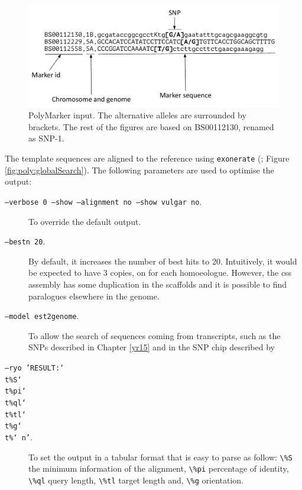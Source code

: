 \begin{figure}
    \includegraphics[width=1\textwidth]{PolyMarker/Figures/aln/input.pdf} 
      \caption[PolyMarker input]{PolyMarker input. The alternative alleles are surrounded by brackets. The rest of the figures are based on BS00112130, renamed as SNP-1.}
    \label{fig:poly:input}
\end{figure}

The template sequences are aligned to the reference using \verb|exonerate| (\citealt{Slater2005}; Figure \ref{fig:poly:globalSearch}). 
The following parameters are used to optimise the output:

\begin{description}

\item[\texttt{--verbose 0 --show --alignment no --show vulgar no}.] To override the default output. 
\item[\texttt{--bestn 20}.] By default, it increases the number of best hits to 20. Intuitively, it would be expected to have 3 copies, on for each homoeologue. However, the \acrshort{css} assembly has some duplication in the scaffolds and it is possible to find paralogues elsewhere in the genome. 
\item[\texttt{--model est2genome}.] To allow the search of sequences coming from transcripts, such as the SNPs described in Chapter \ref{yr15}  and in the SNP chip described by \citep{Allen2011}
\item[\texttt{--ryo 'RESULT:\char`\\t\%S\char`\\t\%pi\char`\\t\%ql\char`\\t\%tl\char`\\t\%g\char`\\t\%\char`\\n'}.]To set the output in a tabular format that is easy to parse as follow: \verb|\%S| the minimum information of the alignment, \verb|\%pi| percentage of identity, \verb|\%ql| query length, \verb|\%tl| target length and, \verb|\%g| orientation. 
\end{description}


